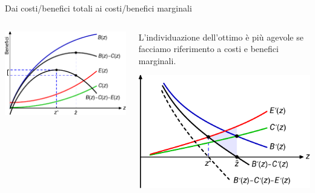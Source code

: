 \documentclass[aspectratio=64,11pt]{beamer}
\begin{document}
\begin{frame}{Dai costi/benefici totali ai costi/benefici marginali}
\begin{columns}
\begin{column}[b]{.5\columnwidth}
\begin{center}
\includegraphics[width=\textwidth]{./figure/esternalita-1-color.pdf}
\end{center}

\vfill

\hfill
{}
\end{column}

\begin{column}[b]{.5\columnwidth}
L'individuazione dell'ottimo è più agevole se facciamo riferimento a costi e
benefici marginali.
\vfill

\begin{center}
\includegraphics[width=\textwidth]{./figure/esternalita-2-color.pdf}
\end{center}
\end{column}
\end{columns}
\end{frame}
\end{document}
